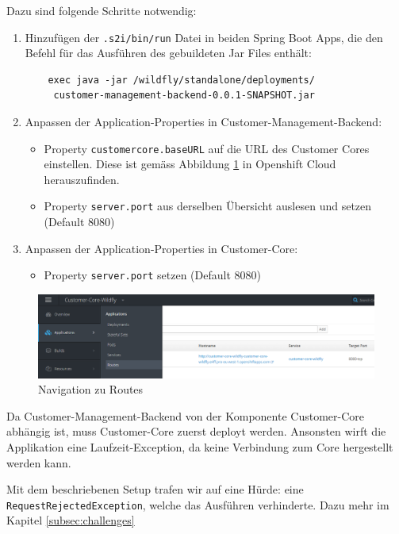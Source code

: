 \documentclass[12pt,a4paper]{article}
\begin{document}
Dazu sind folgende Schritte notwendig:
\begin{enumerate}
	\item Hinzufügen der \texttt{.s2i/bin/run} Datei in beiden Spring Boot Apps, die den Befehl für das Ausführen des gebuildeten Jar Files enthält:
	\begin{lstlisting}
	exec java -jar /wildfly/standalone/deployments/
	 customer-management-backend-0.0.1-SNAPSHOT.jar
	\end{lstlisting}
	\item Anpassen der Application-Properties in Customer-Management-Backend: 
	\begin{itemize}
		\item Property \texttt{customercore.baseURL} auf die URL des Customer Cores einstellen. Diese ist gemäss Abbildung \ref{fig:os-routes} in Openshift Cloud herauszufinden. 
		\item Property \texttt{server.port} aus derselben Übersicht auslesen und setzen (Default 8080)
	\end{itemize}
	\item Anpassen der Application-Properties in Customer-Core:
	\begin{itemize}
		\item Property \texttt{server.port} setzen (Default 8080)
	\end{itemize}
\end{enumerate}

\begin{figure}[h]
	\centering
	\includegraphics[width=1\linewidth]{img/os-routes}
	\caption{Navigation zu Routes}
	\label{fig:os-routes}
\end{figure}

Da Customer-Management-Backend von der Komponente Customer-Core abhängig ist, muss Customer-Core zuerst deployt werden. Ansonsten wirft die Applikation eine Laufzeit-Exception, da keine Verbindung zum Core hergestellt werden kann. 

Mit dem beschriebenen Setup trafen wir auf eine Hürde: eine \texttt{Request\-Rejected\-Exception}, welche das Ausführen verhinderte. Dazu mehr im Kapitel \ref{subsec:challenges}
\end{document}
